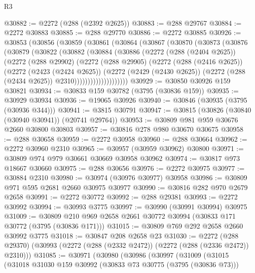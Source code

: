 \begin{lexlean}{R3}
\begin{coremodule}
@30882 := @2272 (@288 (@2392 @2625))
@30883 := @288 @29767
@30884 := @2272 @30883
@30885 := @288 @29770
@30886 := @2272 @30885
@30926 := @30853
    (@30856
      (@30859
        (@30861
          (@30864
            (@30867
              (@30870
                (@30873
                  (@30876
                    (@30879
                      (@30822
                        (@30882
                          (@30884
                            (@30886
                              (@2272
                                (@288 (@2404 @2625))
                                (@2272
                                  (@288 @29902)
                                  (@2272
                                    (@288 @29905)
                                    (@2272
                                      (@288 (@2416 @2625))
                                      (@2272
                                        (@2423 (@2424 @2625))
                                        (@2272
                                          (@2429 (@2430 @2625))
                                          (@2272 (@288 (@2434 @2625)) @2310))))))))))))))))))))
@30929 := @30850 @30926 @159 @30821
@30934 := @30833 @159 @30782 (@3795 (@30836 @159))
@30935 := @30929 @30934
@30936 := @19065 @30926
@30940 := @30846 (@30935 (@3795 (@30936 @344)))
@30941 := @3815 @30791
@30947 := @30815 (@30826 (@30840 (@30940 @30941)) (@20741 @29764))
@30953 := @30809 @981 @959 @30676 @2660 @30800 @30803
@30957 := @30816 @278 @980 @30670 @30675
@30958 := @288 @30658
@30959 := @2272 @30958
@30960 := @288 @30664
@30962 := @2272 @30960 @2310
@30965 := @30957 (@30959 @30962) @30800
@30971 := @30809 @974 @979 @30661 @30669 @30958 @30962
@30974 := @30817 @973 @18667 @30660
@30975 := @288 @30656
@30976 := @2272 @30975
@30977 := @30884 @2310
@30980 := @30974 (@30976 @30977) @30958
@30986 := @30809 @971 @595 @2681 @2660 @30975 @30977
@30990 := @30816 @282 @970 @2679 @2658
@30991 := @2272 @30772
@30992 := @288 @29381
@30993 := @2272 @30992
@30994 := @30993 @3775
@30997 := @30990 (@30991 @30994) @30975
@31009 := @30809 @210 @969 @2658 @2661 @30772 @30994 (@30833 @171 @30772 (@3795 (@30836 @171)))
@31015 := @30809 @769 @292 @2658 @2660 @30992 @3775
@31018 := @30847 @208 @2658 @23
@31030 := @2272
    (@288 @29370)
    (@30993 (@2272 (@288 (@2332 @2472)) (@2272 (@288 (@2336 @2472)) @2310)))
@31085 := @30971
    (@30980
      (@30986
        (@30997
          (@31009
            (@31015
              (@31018
                @31030
                @159
                @30992
                (@30833 @73 @30775 (@3795 (@30836 @73)))

\end{coremodule}
\end{lexlean}
